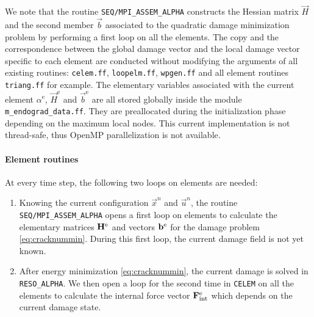 We note that the routine \texttt{SEQ/MPI\_ASSEM\_ALPHA} constructs the Hessian matrix $\vec{H}$ and the second member $\vec{b}$ associated to the quadratic damage minimization problem by performing a first loop on all the elements. The copy and the correspondence between the global damage vector and the local damage vector specific to each element are conducted without modifying the arguments of all existing routines: \texttt{celem.ff}, \texttt{loopelm.ff}, \texttt{wpgen.ff} and all element routines \texttt{triang.ff} for example. The elementary variables associated with the current element $\alpha^\mathrm{e}$, $\vec{H}^\mathrm{e}$ and $\vec{b}^\mathrm{e}$ are all stored globally inside the module \texttt{m\_endograd\_data.ff}. They are preallocated during the initialization phase depending on the maximum local nodes. This current implementation is not thread-safe, thus OpenMP parallelization is not available.

\paragraph{Element routines} At every time step, the following two loops on elements are needed:
\begin{enumerate}
\item Knowing the current configuration $\vec{x}^n$ and $\vec{u}^n$, the routine \texttt{SEQ/MPI\_ASSEM\_ALPHA} opens a first loop on elements to calculate the elementary matrices $\vec{H}^\me$ and vectors $\vec{b}^\me$ for the damage problem \eqref{eq:cracknummin}. During this first loop, the current damage field is not yet known.

\item After energy minimization \eqref{eq:cracknummin}, the current damage is solved in \texttt{RESO\_ALPHA}. We then open a loop for the second time in \texttt{CELEM} on all the elements to calculate the internal force vector $\vec{F}_\mathrm{int}^\me$ which depends on the current damage state.
\end{enumerate}

